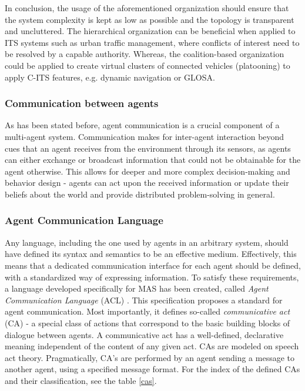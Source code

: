 \documentclass[0main.tex]{subfiles}
\begin{document}
In conclusion, the usage of the aforementioned organization should ensure that the system complexity 
is kept as low as possible and the topology is transparent and uncluttered. The hierarchical 
organization can be beneficial when applied to ITS systems such as urban traffic management, where 
conflicts of interest need to be resolved by a capable authority. Whereas, the coalition-based 
organization could be applied to create virtual clusters of connected vehicles (platooning) to apply 
C-ITS features, e.g. dynamic navigation or GLOSA.

\subsubsection{Communication between agents}

As has been stated before, agent communication is a crucial component of a multi-agent system. 
Communication makes for inter-agent interaction beyond cues that an agent receives from the environment 
through its sensors, as agents can either exchange or broadcast information that could not be obtainable 
for the agent otherwise. This allows for deeper and more complex decision-making and behavior design - 
agents can act upon the received information or update their beliefs about the world and provide 
distributed problem-solving in general. 

\subsubsection{Agent Communication Language}\label{sec-acl}

Any language, including the one used by agents in an arbitrary system, should have defined its syntax and 
semantics to be an effective medium. Effectively, this means that a dedicated communication
interface for each agent should be defined, with a standardized way of expressing information. 
To satisfy these requirements, a language developed specifically for MAS has been created, 
called \emph{Agent Communication Language} (ACL) \cite{IntelligentPhysicalAgents2001}. 
This specification proposes a standard for agent communication. Most importantly, it defines 
so-called \emph{communicative act} (CA) - a special class of actions that correspond to the basic
building blocks of dialogue between agents. A communicative act has a well-defined, declarative
meaning independent of the content of any given act. CAs are modeled on speech act theory.
Pragmatically, CA's are performed by an agent sending a message to another agent, using a
specified message format. For the index of the defined CAs and their classification, see the
table \ref{cas}.
\end{document}
